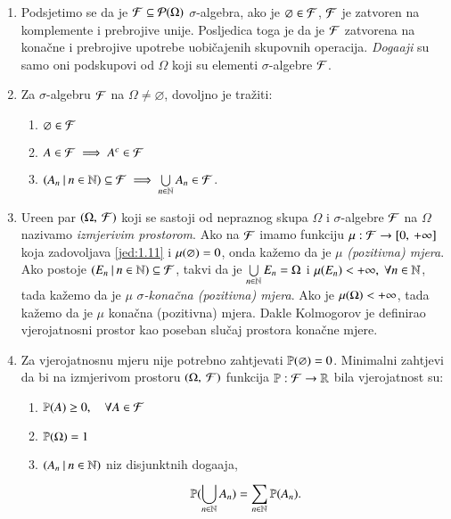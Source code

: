 \begin{nap} \label{nap:1.24}
    \begin{enumerate}[label=(\alph*)]
        \item Podsjetimo se da je $\mathcal{F} \subseteq \mathcal{P}({\Omega})$ $\sigma$-algebra, ako je $\varnothing \in \mathcal{F}$, $\mathcal{F}$ je zatvoren na komplemente i prebrojive unije. Posljedica toga je da je $\mathcal{F}$ zatvorena na kona\v cne i prebrojive upotrebe uobi\v cajenih skupovnih operacija.
        \emph{Doga\dj aji}  su samo oni podskupovi od $\Omega$ koji su elementi $\sigma$-algebre $\mathcal{F}$.
        \item Za $\sigma$-algebru $\mathcal{F}$ na $\Omega \neq  \varnothing$, dovoljno je tra\v ziti:
        \begin{enumerate}[label=(\roman*)]
            \item $\varnothing \in \mathcal{F}$
            \item $A \in \mathcal{F} \implies A^c \in \mathcal{F}$
            \item $({A_n} \: | \: {n \in \mathbb{N}}) \subseteq \mathcal{F} \implies \bigcup\limits_{n \in \mathbb{N}}^{} A_n \in \mathcal{F}$.
        \end{enumerate}
        \item Ure\dj en par $(\Omega, \: \mathcal{F})$ koji se sastoji od nepraznog skupa $\Omega$ i $\sigma$-algebre $\mathcal{F}$ na $\Omega$ nazivamo \emph{izmjerivim prostorom}.
        Ako na $\mathcal{F}$ imamo funkciju $\mu : \mathcal{F} \to [{0}, \:{+ \infty}]$ koja zadovoljava \eqref{jed:1.11} i $\mu({\varnothing}) = 0$, onda ka\v zemo da je $\mu$ \emph{(pozitivna) mjera}.
        Ako postoje $({E_n} \: | \: {n \in \mathbb{N}}) \subseteq \mathcal{F}$, takvi da je $\bigcup\limits_{n \in \mathbb{N}}^{} E_n = \Omega$ i $\mu({E_n}) < +\infty, \; \forall n \in \mathbb{N}$, tada ka\v zemo da je $\mu$ \emph{$\sigma$-kona\v cna (pozitivna) mjera}.
        Ako je $\mu({\Omega}) < +\infty$, tada ka\v zemo da je $\mu$ kona\v cna (pozitivna) mjera.
        Dakle Kolmogorov je definirao vjerojatnosni prostor kao poseban slu\v caj prostora kona\v cne mjere.
        \item Za vjerojatnosnu mjeru nije potrebno zahtjevati $\mathbb{P}({\varnothing}) = 0$.
        Minimalni zahtjevi da bi na izmjerivom prostoru $(\Omega, \: \mathcal{F})$ funkcija $\mathbb{P}: \mathcal{F} \to \mathbb{R}$ bila vjerojatnost su:
        \begin{enumerate}[label=(\roman*)]
            \item $\mathbb{P}({A}) \geq 0, \quad \forall A \in \mathcal{F}$
            \item $\mathbb{P}({\Omega}) = 1$
            \item $({A_n} \: | \: {n \in \mathbb{N}})$ niz disjunktnih doga\dj aja,
            \begin{equation*}
                \mathbb{P}({\bigcup\limits_{n \in \mathbb{N}}^{} A_n}) = \sum\limits_{n \in \mathbb{N}}^{} \mathbb{P}({A_n}).
            \end{equation*}
        \end{enumerate}
    \end{enumerate}
\end{nap}

